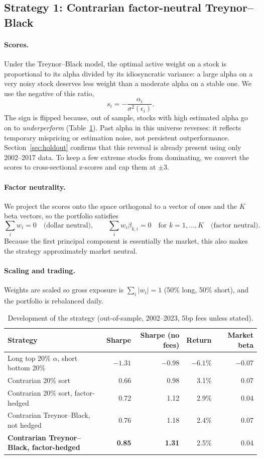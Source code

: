 \documentclass[11pt]{article}
\begin{document}
\subsection{Strategy 1: Contrarian factor-neutral Treynor--Black}

\paragraph{Scores.} Under the Treynor--Black model, the optimal active weight on a stock is proportional to its alpha divided by its idiosyncratic variance: a large alpha on a very noisy stock deserves less weight than a moderate alpha on a stable one. We use the negative of this ratio,
\[
    s_i = -\frac{\alpha_i}{\sigma^2(\epsilon_i)}.
\]
The sign is flipped because, out of sample, stocks with high estimated alpha go on to \emph{underperform} (Table~\ref{tab:development}). Past alpha in this universe reverses: it reflects temporary mispricing or estimation noise, not persistent outperformance. Section~\ref{sec:holdout} confirms that this reversal is already present using only 2002--2017 data. To keep a few extreme stocks from dominating, we convert the scores to cross-sectional z-scores and cap them at $\pm 3$.

\paragraph{Factor neutrality.} We project the scores onto the space orthogonal to a vector of ones and the $K$ beta vectors, so the portfolio satisfies
\[
    \sum_i w_i = 0 \quad \text{(dollar neutral)}, \qquad \sum_i w_i \beta_{k,i} = 0 \quad \text{for } k = 1, \dots, K \quad \text{(factor neutral)}.
\]
Because the first principal component is essentially the market, this also makes the strategy approximately market neutral.

\paragraph{Scaling and trading.} Weights are scaled so gross exposure is $\sum_i |w_i| = 1$ (50\% long, 50\% short), and the portfolio is rebalanced daily.

\begin{table}[H]
\centering
\caption{Development of the strategy (out-of-sample, 2002--2023, 5bp fees unless stated).}
\label{tab:development}
\begin{tabular}{lrrrr}
\toprule
Strategy & Sharpe & Sharpe (no fees) & Return & Market beta \\
\midrule
Long top 20\% $\alpha$, short bottom 20\% & $-1.31$ & $-0.98$ & $-6.1\%$ & $-0.07$ \\
Contrarian 20\% sort & 0.66 & 0.98 & 3.1\% & 0.07 \\
Contrarian 20\% sort, factor-hedged & 0.72 & 1.12 & 2.9\% & 0.04 \\
Contrarian Treynor--Black, not hedged & 0.76 & 1.18 & 2.4\% & 0.07 \\
\textbf{Contrarian Treynor--Black, factor-hedged} & \textbf{0.85} & \textbf{1.31} & 2.5\% & 0.04 \\
\bottomrule
\end{tabular}
\end{table}
\end{document}
